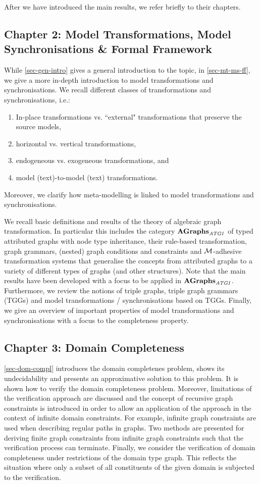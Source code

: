 After we have introduced the main results, we refer briefly to their chapters.

\subsection{Chapter 2: Model Transformations, Model Synchronisations \& Formal Framework}
While \cref{sec-gen-intro} gives a general introduction to the topic, in \cref{sec-mt-ms-ff}, we give a more in-depth introduction to model transformations and synchronisations.
We recall different classes of transformations and synchronisations, i.e.:
\begin{enumerate}
  \item In-place transformations vs. ``external" transformations that preserve the source models,
  \item horizontal vs. vertical transformations,
  \item endogeneous vs. exogeneous transformations, and
  \item model (text)-to-model (text) transformations.
\end{enumerate}  
Moreover, we clarify how meta-modelling is linked to model transformations and synchronisations.

We recall basic definitions and results of the theory of algebraic graph transformation.
In particular this includes the category $\mathbf{AGraphs}_\mathit{ATGI}$ of typed attributed graphs with node type inheritance, their rule-based transformation, graph grammars, (nested) graph conditions and constraints and ${\cal M}$-adhesive transformation systems that generalise the concepts from attributed graphs to a variety of different types of graphs (and other structures).
Note that the main results have been developed with a focus to be applied in $\mathbf{AGraphs}_\mathit{ATGI}$.
Furthermore, we review the notions of triple graphs, triple graph grammars (TGGs) and model transformations / synchronisations based on TGGs.
Finally, we give an overview of important properties of model transformations and synchronisations with a focus to the completeness property.

\subsection{Chapter 3: Domain Completeness}
\cref{sec-dom-compl} introduces the domain completenes problem, shows its undecidability and presents an approximative solution to this problem.
It is shown how to verify the domain completeness problem.
Moreover, limitations of the verification approach are discussed and the concept of recursive graph constraints is introduced in order to allow an application of the approach in the context of infinite domain constraints.
For example, infinite graph constraints are used when describing regular paths in graphs. 
Two methods are presented for deriving finite graph constraints from infinite graph constraints such that the verification process can terminate.
Finally, we consider the verification of domain completeness under restrictions of the domain type graph.
This reflects the situation where only a subset of all constituents of the given domain is subjected to the verification.

